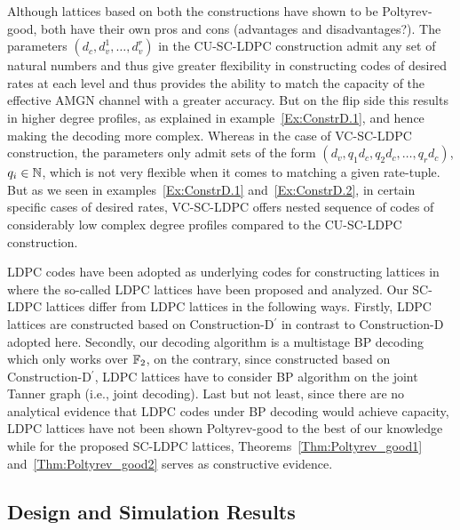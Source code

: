 \begin{remark}
Although lattices based on both the constructions have shown to be Poltyrev-good, both have their own pros and cons (advantages and disadvantages?). The parameters $(d_{c},d_{v}^{1},\ldots,d_{v}^{r})$ in the CU-SC-LDPC construction admit any set of natural numbers and thus give greater flexibility in constructing codes of desired rates at each level and thus provides the ability to match the capacity of the effective AMGN channel with a greater accuracy. But on the flip side this results in higher degree profiles, as explained in example~\ref{Ex:ConstrD.1}, and hence making the decoding more complex.  Whereas in the case of VC-SC-LDPC construction, the parameters only admit sets of the form $(d_{v},q_{1}d_{c},q_{2}d_{c},\ldots,q_{r}d_{c})$, $q_{i}\in\mathbb{N}$, which is not very flexible when it comes to  matching a given rate-tuple. But as we seen in examples~\ref{Ex:ConstrD.1} and~\ref{Ex:ConstrD.2}, in certain specific cases of desired rates, VC-SC-LDPC offers nested sequence of codes of considerably low complex degree profiles compared to the CU-SC-LDPC construction.
\end{remark}

\begin{remark}
    LDPC codes have been adopted as underlying codes for constructing lattices in \cite{sadeghi06} where the so-called LDPC lattices have been proposed and analyzed. Our SC-LDPC lattices differ from LDPC lattices in the following ways. Firstly, LDPC lattices are constructed based on Construction-D$^{\prime}$ \cite{BarnesSloane83} in contrast to Construction-D adopted here. Secondly, our decoding algorithm is a multistage BP decoding which only works over $\mathbb{F}_2$, on the contrary, since constructed based on Construction-D$^{\prime}$, LDPC lattices have to consider BP algorithm on the joint Tanner graph \cite{Banihashemi01} (i.e., joint decoding). Last but not least, since there are no analytical evidence that LDPC codes under BP decoding would achieve capacity, LDPC lattices have not been shown Poltyrev-good to the best of our knowledge while for the proposed SC-LDPC lattices, Theorems~\ref{Thm:Poltyrev_good1} and~\ref{Thm:Poltyrev_good2} serves as constructive evidence.
\end{remark}


\subsection{Design and Simulation Results}

